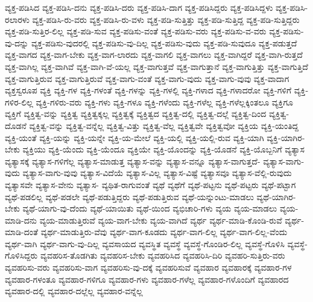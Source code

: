 {ವ್ಯಕ್ತ-ಪಡಿಸಿದ
ವ್ಯಕ್ತ-ಪಡಿಸಿ-ದನು
ವ್ಯಕ್ತ-ಪಡಿಸಿ-ದರು
ವ್ಯಕ್ತ-ಪಡಿಸಿ-ದಾಗ
ವ್ಯಕ್ತ-ಪಡಿಸಿದ್ದರು
ವ್ಯಕ್ತ-ಪಡಿಸಿದ್ದಳು
ವ್ಯಕ್ತ-ಪಡಿಸಿ-ರಲಾರಳು
ವ್ಯಕ್ತ-ಪಡಿಸಿ-ರು-ವರು
ವ್ಯಕ್ತ-ಪಡಿಸಿ-ರು-ವಳು
ವ್ಯಕ್ತ-ಪಡಿ-ಸುತ್ತಿತ್ತು
ವ್ಯಕ್ತ-ಪಡಿ-ಸುತ್ತಿದ್ದ
ವ್ಯಕ್ತ-ಪಡಿ-ಸುತ್ತಿದ್ದರು
ವ್ಯಕ್ತ-ಪಡಿ-ಸುತ್ತಿರ-ಲಿಲ್ಲ
ವ್ಯಕ್ತ-ಪಡಿ-ಸುವ
ವ್ಯಕ್ತ-ಪಡಿಸು-ವಂತೆ
ವ್ಯಕ್ತ-ಪಡಿಸು-ವರು
ವ್ಯಕ್ತ-ಪಡಿಸು-ವ-ವರು
ವ್ಯಕ್ತ-ಪಡಿಸು-ವು-ದನ್ನು
ವ್ಯಕ್ತ-ಪಡಿಸು-ವುದರಲ್ಲಿ
ವ್ಯಕ್ತ-ಪಡಿಸು-ವು-ದಿಲ್ಲ
ವ್ಯಕ್ತ-ಪಡಿಸು-ವುದು
ವ್ಯಕ್ತ-ಪಡಿ-ಸುವುದೂ
ವ್ಯಕ್ತ-ಪಡುತ್ತದೆ
ವ್ಯಕ್ತ-ವಾಗದ
ವ್ಯಕ್ತ-ವಾಗ-ಬೇಕು
ವ್ಯಕ್ತ-ವಾಗ-ಲಾರದು
ವ್ಯಕ್ತ-ವಾಗಲಿ
ವ್ಯಕ್ತ-ವಾಗಲು
ವ್ಯಕ್ತ-ವಾಗಿದ್ದರೆ
ವ್ಯಕ್ತ-ವಾಗಿ-ರುತ್ತದೆ
ವ್ಯಕ್ತ-ವಾಗಿಲ್ಲ
ವ್ಯಕ್ತ-ವಾಗಿವೆ
ವ್ಯಕ್ತ-ವಾಗಿ-ವೆ-ಯಲ್ಲ
ವ್ಯಕ್ತ-ವಾಗುತ್ತವೆ
ವ್ಯಕ್ತ-ವಾಗುತ್ತಾನೆ
ವ್ಯಕ್ತ-ವಾಗುತ್ತಿತ್ತು
ವ್ಯಕ್ತ-ವಾಗುತ್ತಿದೆ
ವ್ಯಕ್ತ-ವಾಗುತ್ತಿರುವ
ವ್ಯಕ್ತ-ವಾಗುತ್ತಿರುವೆ
ವ್ಯಕ್ತ-ವಾಗು-ವಂತೆ
ವ್ಯಕ್ತ-ವಾಗು-ವುದು
ವ್ಯಕ್ತ-ವಾಗು-ವುವು
ವ್ಯಕ್ತ-ವಾದಾಗ
ವ್ಯಕ್ತಸ್ವರೂಪ
ವ್ಯಕ್ತಿ
ವ್ಯಕ್ತಿ-ಗಳ
ವ್ಯಕ್ತಿ-ಗಳಂತೆ
ವ್ಯಕ್ತಿ-ಗಳನ್ನು
ವ್ಯಕ್ತಿ-ಗಳಲ್ಲಿ
ವ್ಯಕ್ತಿ-ಗಳಾದ
ವ್ಯಕ್ತಿ-ಗಳಾದರೋ
ವ್ಯಕ್ತಿ-ಗಳಿಗೆ
ವ್ಯಕ್ತಿ-ಗಳಿರ-ಲಿಲ್ಲ
ವ್ಯಕ್ತಿ-ಗಳಿರು-ವರು
ವ್ಯಕ್ತಿ-ಗಳು
ವ್ಯಕ್ತಿ-ಗಳೂ
ವ್ಯಕ್ತಿ-ಗಳೆಂದು
ವ್ಯಕ್ತಿ-ಗಳೆಲ್ಲ
ವ್ಯಕ್ತಿ-ಗಳೆಲ್ಲಕ್ಕಿಂತಲೂ
ವ್ಯಕ್ತಿಗೂ
ವ್ಯಕ್ತಿಗೆ
ವ್ಯಕ್ತಿತ್ವ-ವನ್ನು
ವ್ಯಕ್ತಿತ್ವ
ವ್ಯಕ್ತಿತ್ವಕ್ಕಲ್ಲ
ವ್ಯಕ್ತಿತ್ವಕ್ಕೆ
ವ್ಯಕ್ತಿತ್ವದ
ವ್ಯಕ್ತಿತ್ವ-ದಲ್ಲಿ
ವ್ಯಕ್ತಿತ್ವ-ದಲ್ಲೆ
ವ್ಯಕ್ತಿತ್ವ-ದಿಂದ
ವ್ಯಕ್ತಿತ್ವ-ದೊಡನೆ
ವ್ಯಕ್ತಿತ್ವ-ವನ್ನು
ವ್ಯಕ್ತಿತ್ವ-ವನ್ನೆಲ್ಲ
ವ್ಯಕ್ತಿತ್ವ-ವಿತ್ತು
ವ್ಯಕ್ತಿತ್ವ-ವೆಲ್ಲ
ವ್ಯಕ್ತಿತ್ವವೇ
ವ್ಯಕ್ತಿತ್ವವೋ
ವ್ಯಕ್ತಿಯ
ವ್ಯಕ್ತಿ-ಯಂತಿದ್ದ
ವ್ಯಕ್ತಿ-ಯಂತೆ
ವ್ಯಕ್ತಿ-ಯನ್ನು
ವ್ಯಕ್ತಿ-ಯನ್ನೇ
ವ್ಯಕ್ತಿ-ಯ-ಮೇಲೆ
ವ್ಯಕ್ತಿ-ಯಲ್ಲಿ
ವ್ಯಕ್ತಿ-ಯಲ್ಲಿ-ರುವ
ವ್ಯಕ್ತಿ-ಯಾಗಿ
ವ್ಯಕ್ತಿ-ಯಾಗಿರ-ಬೇಕು
ವ್ಯಕ್ತಿಯು
ವ್ಯಕ್ತಿ-ಯೆಂದು
ವ್ಯಕ್ತಿ-ಯೆಂದೂ
ವ್ಯಕ್ತಿಯೇ
ವ್ಯಕ್ತಿ-ಯೊಂದನ್ನು
ವ್ಯಕ್ತಿ-ಯೊಡನೆ
ವ್ಯಕ್ತಿ-ಯೊಬ್ಬನಿಗೆ
ವ್ಯತ್ಯಾಸ
ವ್ಯತ್ಯಾಸಕ್ಕೆ
ವ್ಯತ್ಯಾಸ-ಗಳಿಗೆಲ್ಲ
ವ್ಯತ್ಯಾಸ-ಮಾಡುತ್ತ
ವ್ಯತ್ಯಾಸ-ವನ್ನು
ವ್ಯತ್ಯಾಸ-ವನ್ನೂ
ವ್ಯತ್ಯಾಸ-ವಾಗುತ್ತದೆ-
ವ್ಯತ್ಯಾಸ-ವಾಗು-ವುದು
ವ್ಯತ್ಯಾಸ-ವಾಗು-ವುವು
ವ್ಯತ್ಯಾಸ-ವಿದೆಯೆ
ವ್ಯತ್ಯಾಸ-ವಿಲ್ಲ
ವ್ಯತ್ಯಾಸ-ವಿಷ್ಟೆ
ವ್ಯತ್ಯಾಸವೂ
ವ್ಯತ್ಯಾಸ-ವೆಲ್ಲಿ-ರುವುದು
ವ್ಯತ್ಯಾಸವೇ
ವ್ಯತ್ಯಾಸ-ವೇನು
ವ್ಯತ್ಯಾಸ-
ವ್ಯಥಿತ-ರಾಗುವಂತೆ
ವ್ಯಥೆ
ವ್ಯಥೆಗೆ
ವ್ಯಥೆ-ಪಟ್ಟನು
ವ್ಯಥೆ-ಪಟ್ಟರು
ವ್ಯಥೆ-ಪಟ್ಟಾಗ
ವ್ಯಥೆ-ಪಡಲಿಲ್ಲ
ವ್ಯಥೆ-ಪಡಲೇ
ವ್ಯಥೆ-ಪಡುತ್ತಿದ್ದರು
ವ್ಯಥೆ-ಪಡುತ್ತಿರುವ
ವ್ಯಥೆ-ಯನ್ನುಂಟು-ಮಾಡಲು
ವ್ಯಥೆ-ಯಾಗಿರ-ಬೇಕು
ವ್ಯಥೆ-ಯಾಗು-ವು-ದೆಂದು
ವ್ಯಥೆ-ಯಾಯಿತು
ವ್ಯಥೆ-ಯಿಂದ
ವ್ಯಭಿಚಾರಿ-ಗಳು
ವ್ಯಯ
ವ್ಯಯ-ಮಾಡಲು
ವ್ಯಯ-ಮಾಡಿ-ದನು
ವ್ಯಯ-ಮಾಡುತ್ತಿರುವೆ
ವ್ಯಯ-ವಾಗ-ಬೇಕು
ವ್ಯಯ-ವಾಗಿದೆ
ವ್ಯರ್ಥ
ವ್ಯರ್ಥ-ಮಾಡಿ-ಕೊಂಡಿ-ರುವೆ
ವ್ಯರ್ಥ-ಮಾಡಿ-ದಂತೆ
ವ್ಯರ್ಥ-ಮಾಡುತ್ತಿರು-ವೆವು
ವ್ಯರ್ಥ-ವಾಗ-ಕೂಡದು
ವ್ಯರ್ಥ-ವಾಗ-ಲಿಲ್ಲ
ವ್ಯರ್ಥ-ವಾಗ-ಲಿಲ್ಲ-ವೆಂದು
ವ್ಯರ್ಥ-ವಾಗಿ
ವ್ಯರ್ಥ-ವಾಗು-ವು-ದಿಲ್ಲ
ವ್ಯವಸಾಯದ
ವ್ಯವಸ್ಥಿತ
ವ್ಯವಸ್ಥೆ
ವ್ಯವಸ್ಥೆ-ಗೊಂಡಿರ-ಲಿಲ್ಲ
ವ್ಯವಸ್ಥೆ-ಗೊಳಿಸಿ
ವ್ಯವಸ್ಥೆ-ಗೊಳಿಸಿದ್ದರು
ವ್ಯವಹರಿಸ-ತೊಡಗಿತು
ವ್ಯವಹರಿಸ-ಬೇಕು
ವ್ಯವಹರಿಸಿದ
ವ್ಯವಹರಿಸಿ-ದಿರಿ
ವ್ಯವಹರಿ-ಸುತ್ತಿರು-ವರು
ವ್ಯವಹರಿಸು-ವರು
ವ್ಯವಹರಿಸು-ವಾಗ
ವ್ಯವಹರಿಸು-ವು-ದಕ್ಕೆ
ವ್ಯವಹರಿಸುವೆ
ವ್ಯವಹಾರ
ವ್ಯವಹಾರಕ್ಕೆ
ವ್ಯವಹಾರ-ಗಳ
ವ್ಯವಹಾರ-ಗಳಂತೂ
ವ್ಯವಹಾರ-ಗಳಿಗೂ
ವ್ಯವಹಾರ-ಗಳು
ವ್ಯವಹಾರ-ಗಳೆಲ್ಲ
ವ್ಯವಹಾರ-ಗಳೊಂದಿಗೆ
ವ್ಯವಹಾರದ
ವ್ಯವಹಾರ-ದಲ್ಲಿ
ವ್ಯವಹಾರ-ದಲ್ಲೆಲ್ಲ
ವ್ಯವಹಾರ-ವನ್ನೆಲ್ಲ
}
